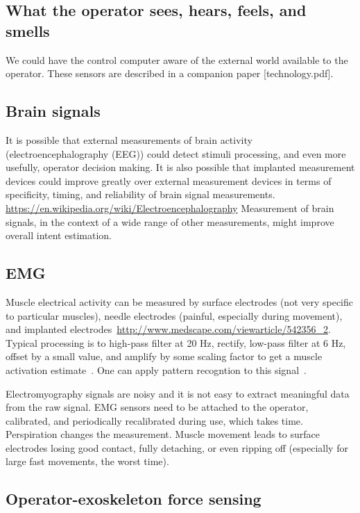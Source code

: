 \documentclass[letterpaper,12pt,fullpage]{article}
\begin{document}
\subsection{What the operator sees, hears, feels, and smells}

We could have the control computer aware of the external world
available to the operator. These sensors are described in
a companion paper [technology.pdf].

\subsection{Brain signals}

It is possible that external measurements of brain activity
(electroencephalography (EEG)) could detect stimuli processing, and
even more usefully, operator decision making.
It is also possible that implanted measurement devices could improve
greatly over external measurement devices in terms of specificity,
timing, and reliability of brain signal measurements.
\url{https://en.wikipedia.org/wiki/Electroencephalography}
Measurement of brain signals,
in the context of a wide range of other measurements,
might improve overall intent estimation.


\subsection{EMG}

Muscle electrical activity can be measured by surface electrodes
(not very specific to particular muscles), needle electrodes (painful,
especially during movement), and implanted electrodes~\url{http://www.medscape.com/viewarticle/542356_2}.
Typical processing is to 
high-pass filter at 20 Hz, rectify, low-pass filter at 6 Hz,
offset by a small value, and amplify by some scaling factor
to get a muscle activation estimate~\cite{IEEE07139980}.
One can apply pattern recogntion to this signal~\cite{IEEE07222568}.

Electromyography 
signals are noisy and it is not easy to extract
meaningful data from the raw signal. 
EMG sensors
need to be attached to the operator, calibrated,
and periodically recalibrated during use, which takes time.
Perspiration changes the measurement. 
Muscle movement leads to surface electrodes losing good contact,
fully detaching, or
even ripping off (especially for large fast
movements, the worst time).

\subsection{Operator-exoskeleton force sensing}
\end{document}
